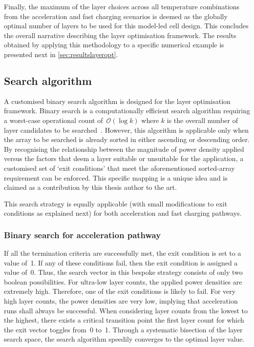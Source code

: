 Finally, the  maximum of the  layer choices across all  temperature combinations
from the  acceleration and  fast charging  scenarios is  deemed as  the globally
optimal  number of  layers  to be  used  for this  model-led  cell design.  This
concludes the overall narrative describing the layer optimisation framework. The
results obtained by applying this methodology to a specific numerical example is
presented next in \cref{sec:resultslayeropt}.


\subsection{Search algorithm}\label{sec:searchalgo}

A  customised binary  search algorithm  is designed  for the  layer optimisation
framework.  Binary  search  is  a  computationally  efficient  search  algorithm
requiring a worst-case  operational count of~$\mathcal{O}(\log k)$  where $k$ is
the  overall  number  of  layer  candidates  to  be  searched~\cite{Cormen2009}.
However, this  algorithm is  applicable only  when the array  to be  searched is
already  sorted in  either ascending  or  descending order.  By recognising  the
relationship between the  magnitude of power density applied  versus the factors
that deem a  layer suitable or unsuitable for the  application, a customised set
of `exit conditions'  that meet the aforementioned  sorted-array requirement can
be  enforced. This  specific  mapping is  a  unique  idea and  is  claimed as  a
contribution by this thesis author to the art.

This search  strategy is  equally applicable (with  small modifications  to exit
conditions as explained next) for both acceleration and fast charging pathways.

\subsubsection*{Binary search for acceleration pathway}

If all the termination criteria are  successfully met, the exit condition is set
to a  value of~1. If any  of these conditions  fail, then the exit  condition is
assigned a value of~0. Thus, the search vector in this bespoke strategy consists
of only two boolean possibilities. For ultra-low layer counts, the applied power
densities are extremely high. Therefore, one of the exit conditions is likely to
fail. For  very high layer  counts, the power  densities are very  low, implying
that acceleration runs shall always be successful. When considering layer counts
from the lowest to the highest,  there exists a critical transition point \viz{}
the first layer count  for which the exit vector toggles  from~0 to~1. Through a
systematic bisection  of the layer  search space, the search  algorithm speedily
converges to the optimal layer value.

